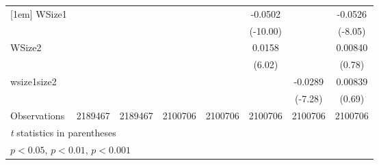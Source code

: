 {\begin{tabular}{l*{7}{c}}
[1em]
WSize1              &                     &                     &                     &                     &     -0.0502\sym{***}&                     &     -0.0526\sym{***}\\
                    &                     &                     &                     &                     &    (-10.00)         &                     &     (-8.05)         \\
[1em]
WSize2              &                     &                     &                     &                     &      0.0158\sym{***}&                     &     0.00840         \\
                    &                     &                     &                     &                     &      (6.02)         &                     &      (0.78)         \\
[1em]
wsize1size2         &                     &                     &                     &                     &                     &     -0.0289\sym{***}&     0.00839         \\
                    &                     &                     &                     &                     &                     &     (-7.28)         &      (0.69)         \\
\hline
Observations        &     2189467         &     2189467         &     2100706         &     2100706         &     2100706         &     2100706         &     2100706         \\
\hline\hline
\multicolumn{8}{l}{\footnotesize \textit{t} statistics in parentheses}\\
\multicolumn{8}{l}{\footnotesize \sym{*} \(p<0.05\), \sym{**} \(p<0.01\), \sym{***} \(p<0.001\)}\\
\end{tabular}
}

